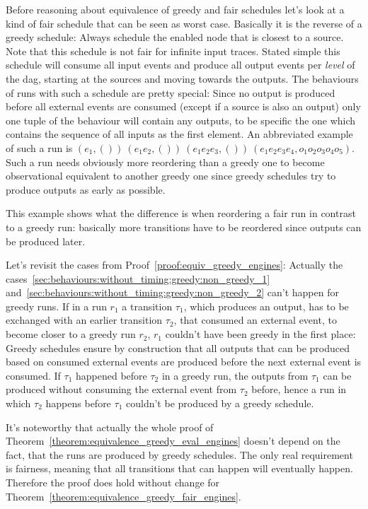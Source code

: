   Before reasoning about equivalence of greedy and fair schedules let's look at a kind of fair schedule that can be seen as worst case.
  Basically it is the reverse of a greedy schedule: Always schedule the enabled node that is closest to a source.
  Note that this schedule is not fair for infinite input traces.
  Stated simple this schedule will consume all input events and produce all output events per \emph{level} of the \gls{dag}, starting at the sources and moving towards the outputs.
  The behaviours of runs with such a schedule are pretty special: Since no output is produced before all external events are consumed (except if a source is also an output) only one tuple of the behaviour will contain any outputs, to be specific the one which contains the sequence of all inputs as the first element.
  An abbreviated example of such a run is \((e_1,())\ (e_1e_2,())\ (e_1e_2e_3,())\ (e_1e_2e_3e_4,o_1o_2o_3o_4o_5)\).
  Such a run needs obviously more reordering than a greedy one to become observational equivalent to another greedy one since greedy schedules try to produce outputs as early as possible.

  This example shows what the difference is when reordering a fair run in contrast to a greedy run: basically more transitions have to be reordered since outputs can be produced later.

  Let's revisit the cases from Proof~\ref{proof:equiv_greedy_engines}:
  Actually the cases~\ref{sec:behaviours:without_timing:greedy:non_greedy_1} and~\ref{sec:behaviours:without_timing:greedy:non_greedy_2} can't happen for greedy runs.
  If in a run \(r_1\) a transition \(\tau_1\), which produces an output, has to be exchanged with an earlier transition \(\tau_2\), that consumed an external event, to become closer to a greedy run \(r_2\), \(r_1\) couldn't have been greedy in the first place:
  Greedy schedules ensure by construction that all outputs that can be produced based on consumed external events are produced before the next external event is consumed.
  If \(\tau_1\) happened before \(\tau_2\) in a greedy run, the outputs from \(\tau_1\) can be produced without consuming the external event from \(\tau_2\) before, hence a run in which \(\tau_2\) happens before \(\tau_1\) couldn't be produced by a greedy schedule.

  It's noteworthy that actually the whole proof of Theorem~\ref{theorem:equivalence_greedy_eval_engines} doesn't depend on the fact, that the runs are produced by greedy schedules.
  The only real requirement is fairness, meaning that all transitions that can happen will eventually happen.
  Therefore the proof does hold without change for Theorem~\ref{theorem:equivalence_greedy_fair_engines}.

